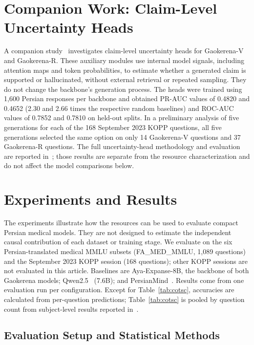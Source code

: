 \documentclass[manuscript,screen,review]{acmart}
\begin{document}
\section{Companion Work: Claim-Level Uncertainty Heads}\label{sec:uhead}

A companion study~\cite{b3} investigates claim-level uncertainty heads for Gaokerena-V and Gaokerena-R. These auxiliary modules use internal model signals, including attention maps and token probabilities, to estimate whether a generated claim is supported or hallucinated, without external retrieval or repeated sampling. They do not change the backbone's generation process. The heads were trained using 1,600 Persian responses per backbone and obtained PR-AUC values of 0.4820 and 0.4652 (2.30 and 2.66 times the respective random baselines) and ROC-AUC values of 0.7852 and 0.7810 on held-out splits. In a preliminary analysis of five generations for each of the 168 September 2023 KOPP questions, all five generations selected the same option on only 14 Gaokerena-V questions and 37 Gaokerena-R questions. The full uncertainty-head methodology and evaluation are reported in~\cite{b3}; those results are separate from the resource characterization and do not affect the model comparisons below.

\section{Experiments and Results}\label{sec:results}

The experiments illustrate how the resources can be used to evaluate compact Persian medical models. They are not designed to estimate the independent causal contribution of each dataset or training stage. We evaluate on the six Persian-translated medical MMLU subsets (FA\_MED\_MMLU, 1,089 questions) and the September 2023 KOPP session (168 questions); other KOPP sessions are not evaluated in this article. Baselines are Aya-Expanse-8B, the backbone of both Gaokerena models; Qwen2.5~\cite{b35} (7.6B); and PersianMind~\cite{b14}. Results come from one evaluation run per configuration. Except for Table~\ref{tab:cotsc}, accuracies are calculated from per-question predictions; Table~\ref{tab:cotsc} is pooled by question count from subject-level results reported in~\cite{b2}.

\subsection{Evaluation Setup and Statistical Methods}\label{subsec6.0}
\end{document}
